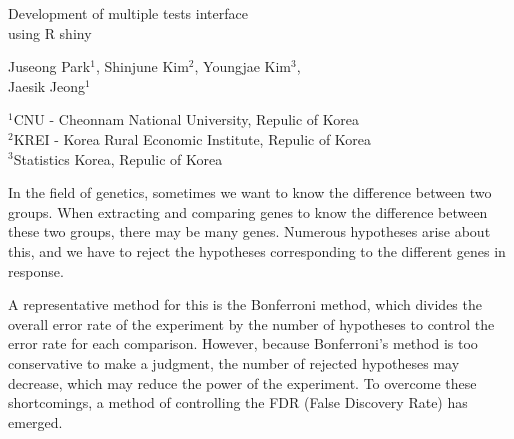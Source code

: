 \documentclass{article}
\def\title#1{{\Large\bf  \begin{center} #1 \vspace{0pt} \end{center}  } }
\def\authors#1{{\large\bf \begin{center} #1 \vspace{0pt} \end{center} } }
\def\university#1{{\sl \begin{center} #1 \vspace{0pt} \end{center} } }
\def\inst#1{\unskip$^{#1}$}
\begin{document}
%
%
%


\title{Development of multiple tests interface \\ using R shiny}

\bigskip 

%
%

\authors{Juseong Park\inst{1}, Shinjune Kim\inst{2}, Youngjae Kim\inst{3}, \\ Jaesik Jeong\inst{1}
     }

\smallskip 

%
%

 \university{\inst{1}CNU - Cheonnam National University, Repulic of Korea\\
 \inst{2}KREI - Korea Rural Economic Institute, Repulic of Korea\\ 
 \inst{3}Statistics Korea, Repulic of Korea
       }


\bigskip


\medskip

In the field of genetics, sometimes we want to know the difference between two groups. When extracting and comparing genes to know the difference between these two groups, there may be many genes. Numerous hypotheses arise about this, and we have to reject the hypotheses corresponding to the different genes in response.

A representative method for this is the Bonferroni method, which divides the overall error rate of the experiment by the number of hypotheses to control the error rate for each comparison. However, because Bonferroni's method is too conservative to make a judgment, the number of rejected hypotheses may decrease, which may reduce the power of the experiment. To overcome these shortcomings, a method of controlling the FDR (False Discovery Rate) has emerged.
\end{document}
